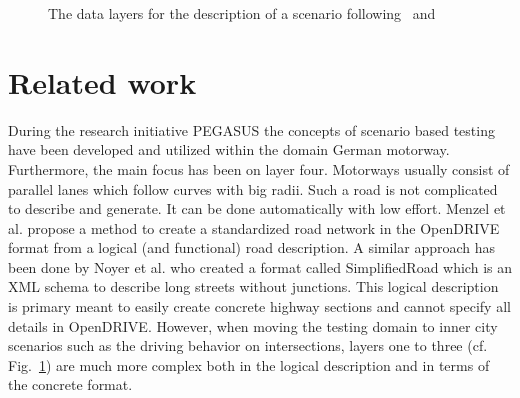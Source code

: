 \documentclass[a4paper, 10pt, conference]{ieeeconf}      %
\begin{document}
\begin{figure}[t]
	\caption{The data layers for the description of a scenario following~\cite{bock2018data} and~\cite{bagschik2018ontology}}
	\label{fig_layers}
\end{figure}

\section{Related work} \label{sec_relwork}
During the research initiative PEGASUS \cite{pegasus.2019} the concepts of scenario based testing have been developed and utilized within the domain German motorway. Furthermore, the main focus has been on layer four. Motorways usually consist of parallel lanes which follow curves with big radii. Such a road is not complicated to describe and generate. It can be done automatically with low effort. Menzel et al. \cite{menzel2019functional} propose a method to create a standardized road network in the OpenDRIVE format from a logical (and functional) road description. 
A similar approach has been done by Noyer et al. \cite{dlrODRgen} who created a format called SimplifiedRoad which is an XML schema to describe long streets without junctions. This logical description is primary meant to easily create concrete highway sections and cannot specify all details in OpenDRIVE. However, when moving the testing domain to inner city scenarios such as the driving behavior on intersections, layers one to three (cf. Fig.~\ref{fig_layers}) are much more complex both in the logical description and in terms of the concrete format. 
\end{document}
